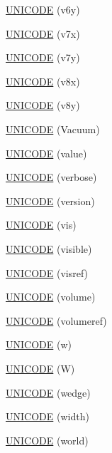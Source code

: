 \begin{DoxyCompactItemize}
\item 
\hyperlink{namespace_d_d4hep_1_1_x_m_l_a6e7c67984a8cf2eb6812abaf5c316348}{UNICODE} (v6y)
\item 
\hyperlink{namespace_d_d4hep_1_1_x_m_l_a8a8285a1cab7219e98e5f19d63a38ff4}{UNICODE} (v7x)
\item 
\hyperlink{namespace_d_d4hep_1_1_x_m_l_ac32e8eebf47d2f73da5c933158571709}{UNICODE} (v7y)
\item 
\hyperlink{namespace_d_d4hep_1_1_x_m_l_a924598e2698f87b90a89aec901430f1c}{UNICODE} (v8x)
\item 
\hyperlink{namespace_d_d4hep_1_1_x_m_l_a0b2731ecd604c0cd3ab3bdd0c83cbedc}{UNICODE} (v8y)
\item 
\hyperlink{namespace_d_d4hep_1_1_x_m_l_a97baa19c68264de567e9a84e0de8bc41}{UNICODE} (Vacuum)
\item 
\hyperlink{namespace_d_d4hep_1_1_x_m_l_a6fb2124f0f1c59d9edb12bdc24b6496b}{UNICODE} (value)
\item 
\hyperlink{namespace_d_d4hep_1_1_x_m_l_a6fef579aa8b964f163b6bd0a5dba0dfa}{UNICODE} (verbose)
\item 
\hyperlink{namespace_d_d4hep_1_1_x_m_l_a632e6f9f26b064fd2a03502276ce9618}{UNICODE} (version)
\item 
\hyperlink{namespace_d_d4hep_1_1_x_m_l_a99a03e4dd90ede6fd13b47651a666b4a}{UNICODE} (vis)
\item 
\hyperlink{namespace_d_d4hep_1_1_x_m_l_a926cb418b7488003cd68a90c86bfbe9e}{UNICODE} (visible)
\item 
\hyperlink{namespace_d_d4hep_1_1_x_m_l_a2b257d2b8e7ef1b5366412661b7389cd}{UNICODE} (visref)
\item 
\hyperlink{namespace_d_d4hep_1_1_x_m_l_add4e355449c9f87c33a9a5fd0b53d5fb}{UNICODE} (volume)
\item 
\hyperlink{namespace_d_d4hep_1_1_x_m_l_aed97d8b9631642de33dd19b423dbfa47}{UNICODE} (volumeref)
\item 
\hyperlink{namespace_d_d4hep_1_1_x_m_l_a78e581c638d6c80d58bd762db781dc20}{UNICODE} (w)
\item 
\hyperlink{namespace_d_d4hep_1_1_x_m_l_afc3ecb3c673108aa0280992595b7fe97}{UNICODE} (W)
\item 
\hyperlink{namespace_d_d4hep_1_1_x_m_l_a580cf1ec963c574cab83816588cf4cb3}{UNICODE} (wedge)
\item 
\hyperlink{namespace_d_d4hep_1_1_x_m_l_a0d1ef7fb3901bb28fe1d8a5b6e27a0b2}{UNICODE} (width)
\item 
\hyperlink{namespace_d_d4hep_1_1_x_m_l_ae94c683fa69273318b6d476f3284bd5b}{UNICODE} (world)

\end{DoxyCompactItemize}
